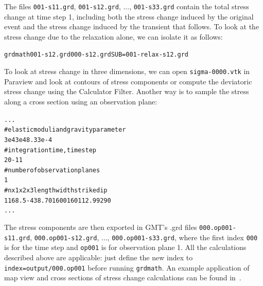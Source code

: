 \documentclass[10pt]{article}
\begin{document}
The files \verb'001-s11.grd', \verb'001-s12.grd', ..., \verb'001-s33.grd' contain the total stress change at time step 1, including both the stress change induced by the original event and the stress change induced by the transient that follows. To look at the stress change due to the relaxation alone, we can isolate it as follows:
\begin{alltt}
{\color{NavyBlue}grdmath 001-s12.grd 000-s12.grd SUB = 001-relax-s12.grd}
\end{alltt}

To look at stress change in three dimensions, we can open \verb'sigma-0000.vtk' in Paraview and look at contours of stress components or compute the deviatoric stress change using the Calculator Filter. Another way is to sample the stress along a cross section using an observation plane:
\begin{alltt}
...
# elastic moduli and gravity parameter
3e4 3e4 8.33e-4
# integration time, time step
20 -1 1
# number of observation planes
{\color{orange}1}
# n     x1     x2 x3 length width  strike dip
{\color{orange}  1  168.5 -438.7  0   1600   160 112.992  90}
...
\end{alltt}
The stress components are then exported in GMT's .grd files \verb'000.op001-s11.grd', \verb'000.op001-s12.grd', ..., \verb'000.op001-s33.grd', where the first index \verb'000' is for the time step and \verb'op001' is for observation plane 1. All the calculations described above are applicable: just define the new index to \verb'index=output/000.op001' before running \verb'grdmath'. An example application of map view and cross sections of stress change calculations can be found in~\cite{rousset+12}.
\end{document}
